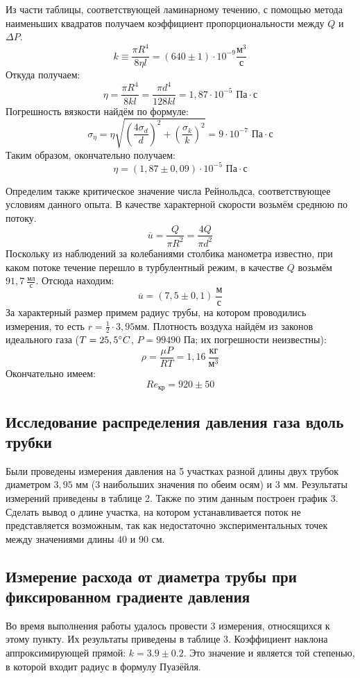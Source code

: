 \documentclass[15pt,a5paper,reqno]{article}
\begin{document}
    Из части таблицы, соответствующей ламинарному течению, с помощью метода наименьших квадратов получаем коэффициент пропорциональности между $Q$ и $\Delta P$.
    \[k\equiv \frac{\pi R^4}{8\eta l} = (640\pm 1)\cdot10^{-9}\frac{\text{м}^3}{\text{с}}\]
    Откуда получаем:
    \[\eta = \frac{\pi R^4}{8k l} = \frac{\pi d^4}{128kl} = 1,87\cdot10^{-5}\text{ Па}\cdot\text{с}\]
    Погрешность вязкости найдём по формуле:
    \[\sigma_{\eta} = \eta\sqrt{\left(\frac{4\sigma_d}{d}\right)^2 + \left(\frac{\sigma_k}{k}\right)^2} = 9\cdot10^{-7}\text{ Па}\cdot\text{с}\]
    Таким образом, окончательно получаем:
    \[\eta = (1,87 \pm 0,09)\cdot10^{-5}\text{ Па}\cdot\text{с}\]
    
    Определим также критическое значение числа Рейнольдса, соответствующее условиям данного опыта. В качестве характерной скорости возьмём среднюю по потоку.
    \[\overline{u} = \frac{Q}{\pi R^2} = \frac{4Q}{\pi d^2}\]
    Поскольку из наблюдений за колебаниями столбика манометра известно, при каком потоке течение перешло в турбулентный режим, в качестве $Q$ возьмём $91,7\ \frac{\text{мл}}{\text{с}}$. Отсюда находим:
    \[\overline{u} = (7,5 \pm 0,1)\ \frac{\text{м}}{\text{с}}\]
    За характерный размер примем радиус трубы, на котором проводились измерения, то есть $r = \frac{1}{2}\cdot 3,95\text{мм}$. Плотность воздуха найдём из законов идеального газа ($T = 25,5 \degree C$, $P = 99490\text{ Па}$; их погрешности неизвестны):
    \[\rho = \frac{\mu P}{RT} = 1,16\ \frac{\text{кг}}{\text{м}^3}\] 
    Окончательно имеем:
    \[Re_{\text{кр}} = 920 \pm 50\]
    
    \subsection{Исследование распределения давления газа вдоль трубки}
    Были проведены измерения давления на 5 участках разной длины двух трубок диаметром $3,95\text{ мм}$ (3 наибольших значения по обеим осям) и $3\text{ мм}$. Результаты измерений приведены в таблице 2. Также по этим данным построен график 3. Сделать вывод о длине участка, на котором устанавливается поток не представляется возможным, так как недостаточно экспериментальных точек между значениями длины 40 и 90 см.
    
    \subsection{Измерение расхода от диаметра трубы при фиксированном градиенте давления}
    Во время выполнения работы удалось провести 3 измерения, относящихся к этому пункту. Их результаты приведены в таблице 3.
    Коэффициент наклона аппроксимирующей прямой: $k = 3.9 \pm 0.2$. Это значение и является той степенью, в которой входит радиус в формулу Пуазёйля.
    
\end{document}
